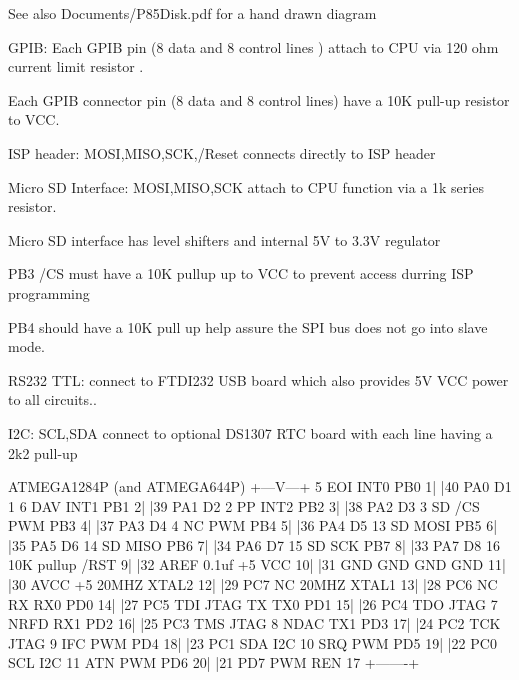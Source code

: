 \begin{DoxyItemize}
\item \begin{DoxySeeAlso}{See also}
Documents/\+P85\+Disk.\+pdf for a hand drawn diagram
\end{DoxySeeAlso}

\item G\+P\+IB\+: Each G\+P\+IB pin (8 data and 8 control lines ) attach to C\+PU via 120 ohm current limit resistor .
\begin{DoxyItemize}
\item Each G\+P\+IB connector pin (8 data and 8 control lines) have a 10K pull-\/up resistor to V\+CC.
\end{DoxyItemize}
\item I\+SP header\+: M\+O\+SI,M\+I\+SO,S\+CK,/\+Reset connects directly to I\+SP header
\item Micro SD Interface\+: M\+O\+SI,M\+I\+SO,S\+CK attach to C\+PU function via a 1k series resistor.
\begin{DoxyItemize}
\item Micro SD interface has level shifters and internal 5V to 3.\+3V regulator
\item P\+B3 /\+CS must have a 10K pullup up to V\+CC to prevent access durring I\+SP programming
\item P\+B4 should have a 10K pull up help assure the S\+PI bus does not go into slave mode.
\end{DoxyItemize}
\item R\+S232 T\+TL\+: connect to F\+T\+D\+I232 U\+SB board which also provides 5V V\+CC power to all circuits..
\item I2C\+: S\+CL,S\+DA connect to optional D\+S1307 R\+TC board with each line having a 2k2 pull-\/up 
\begin{DoxyPre}\end{DoxyPre}



\begin{DoxyPre}                       ATMEGA1284P (and ATMEGA644P) 
                       +---V---+ 
     5 EOI INT0  PB0  1|       |40  PA0      D1  1 
     6 DAV INT1  PB1  2|       |39  PA1      D2  2 
       PP  INT2  PB2  3|       |38  PA2      D3  3 
    SD /CS  PWM  PB3  4|       |37  PA3      D4  4 
       NC   PWM  PB4  5|       |36  PA4      D5 13 
    SD     MOSI  PB5  6|       |35  PA5      D6 14 
    SD     MISO  PB6  7|       |34  PA6      D7 15 
    SD      SCK  PB7  8|       |33  PA7      D8 16 
    10K pullup  /RST  9|       |32  AREF     0.1uf 
       +5        VCC 10|       |31  GND      GND   
       GND       GND 11|       |30  AVCC     +5    
    20MHZ      XTAL2 12|       |29  PC7      NC    
    20MHZ      XTAL1 13|       |28  PC6      NC    
       RX   RX0  PD0 14|       |27  PC5  TDI JTAG 
       TX   TX0  PD1 15|       |26  PC4  TDO JTAG 
     7 NRFD RX1  PD2 16|       |25  PC3  TMS JTAG 
     8 NDAC TX1  PD3 17|       |24  PC2  TCK JTAG 
     9 IFC  PWM  PD4 18|       |23  PC1  SDA I2C   
    10 SRQ  PWM  PD5 19|       |22  PC0  SCL I2C  
    11 ATN  PWM  PD6 20|       |21  PD7  PWM REN 17 
                       +-------+ 
\end{DoxyPre}


\end{DoxyItemize}
